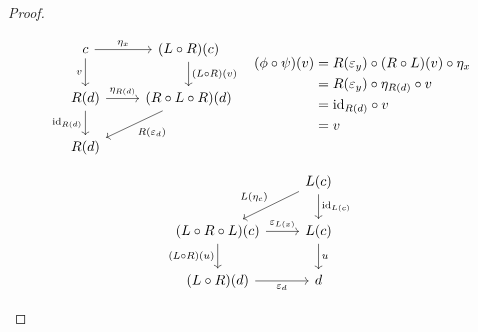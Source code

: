 \begin{theorem}
\begin{proof}
\begin{description}
        \[\begin{tikzcd}[ampersand replacement=\&]
          c \& {(L\circ R)(c)} \\
          {R(d)} \& {(R\circ L\circ R)(d)} \\
          {R(d)}
          \arrow["{\id_{R(d)}}"', from=2-1, to=3-1]
          \arrow["{\eta_{R(d)}}", from=2-1, to=2-2]
          \arrow["{R(\varepsilon_d)}", from=2-2, to=3-1]
          \arrow["{(L\circ R)(v)}", from=1-2, to=2-2]
          \arrow["v"', from=1-1, to=2-1]
          \arrow["{\eta_x}", from=1-1, to=1-2]
        \end{tikzcd}
        \quad
        \begin{aligned}
          (\phi\circ\psi)(v)
            &= R(\epsilon_y)\circ (R\circ L)(v) \circ \eta_x\\
            &= R(\epsilon_y) \circ \eta_{R(d)} \circ v\\
            &= \id_{R(d)} \circ v\\
            &= v
        \end{aligned}
        \]
        \[\begin{tikzcd}[ampersand replacement=\&]
          \& {L(c)} \\
          {(L\circ R\circ L)(c)} \& {L(c)} \\
          {(L\circ R)(d)} \& d
          \arrow["{\id_{L(c)}}", from=1-2, to=2-2]
          \arrow["{L(\eta_c)}"', from=1-2, to=2-1]
          \arrow["{\varepsilon_{L(x)}}", from=2-1, to=2-2]
          \arrow["u", from=2-2, to=3-2]
          \arrow["{(L\circ R)(u)}"', from=2-1, to=3-1]
          \arrow["{\varepsilon_d}"', from=3-1, to=3-2]
        \end{tikzcd}
\]
\end{description}
\end{proof}
\end{theorem}
